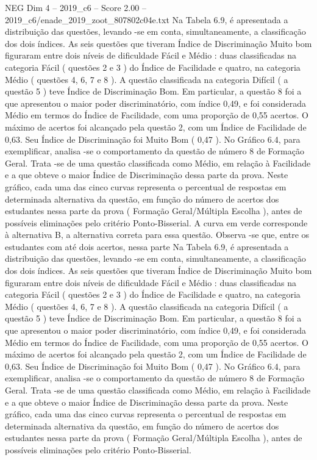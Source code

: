 \begin{textsample}{NEG Dim 4 – 2019\_c6 – Score 2.00 – 2019\_c6/enade\_2019\_zoot\_807802c04e.txt}
Na Tabela 6.9, é apresentada a distribuição das questões, levando -se em conta, simultaneamente, a classificação dos dois índices.
As seis questões que tiveram Índice de Discriminação Muito bom figuraram entre dois níveis de dificuldade Fácil e Médio : duas classificadas na categoria Fácil ( questões 2 e 3 ) do Índice de Facilidade e quatro, na categoria Médio ( questões 4, 6, 7 e 8 ).
A questão classificada na categoria Difícil ( a questão 5 ) teve Índice de Discriminação Bom.
Em particular, a questão 8 foi a que apresentou o maior poder discriminatório, com índice 0,49, e foi considerada Médio em termos do Índice de Facilidade, com uma proporção de 0,55 acertos.
O máximo de acertos foi alcançado pela questão 2, com um Índice de Facilidade de 0,63.
Seu Índice de Discriminação foi Muito Bom ( 0,47 ).
No Gráfico 6.4, para exemplificar, analisa -se o comportamento da questão de número 8 de Formação Geral.
Trata -se de uma questão classificada como Médio, em relação à Facilidade e a que obteve o maior Índice de Discriminação dessa parte da prova.
Neste gráfico, cada uma das cinco curvas representa o percentual de respostas em determinada alternativa da questão, em função do número de acertos dos estudantes nessa parte da prova ( Formação Geral/Múltipla Escolha ), antes de possíveis eliminações pelo critério Ponto-Bisserial.
A curva em verde corresponde à alternativa B, a alternativa correta para essa questão.
Observa -se que, entre os estudantes com até dois acertos, nessa parte Na Tabela 6.9, é apresentada a distribuição das questões, levando -se em conta, simultaneamente, a classificação dos dois índices.
As seis questões que tiveram Índice de Discriminação Muito bom figuraram entre dois níveis de dificuldade Fácil e Médio : duas classificadas na categoria Fácil ( questões 2 e 3 ) do Índice de Facilidade e quatro, na categoria Médio ( questões 4, 6, 7 e 8 ).
A questão classificada na categoria Difícil ( a questão 5 ) teve Índice de Discriminação Bom.
Em particular, a questão 8 foi a que apresentou o maior poder discriminatório, com índice 0,49, e foi considerada Médio em termos do Índice de Facilidade, com uma proporção de 0,55 acertos.
O máximo de acertos foi alcançado pela questão 2, com um Índice de Facilidade de 0,63.
Seu Índice de Discriminação foi Muito Bom ( 0,47 ).
No Gráfico 6.4, para exemplificar, analisa -se o comportamento da questão de número 8 de Formação Geral.
Trata -se de uma questão classificada como Médio, em relação à Facilidade e a que obteve o maior Índice de Discriminação dessa parte da prova.
Neste gráfico, cada uma das cinco curvas representa o percentual de respostas em determinada alternativa da questão, em função do número de acertos dos estudantes nessa parte da prova ( Formação Geral/Múltipla Escolha ), antes de possíveis eliminações pelo critério Ponto-Bisserial.

\end{textsample}
